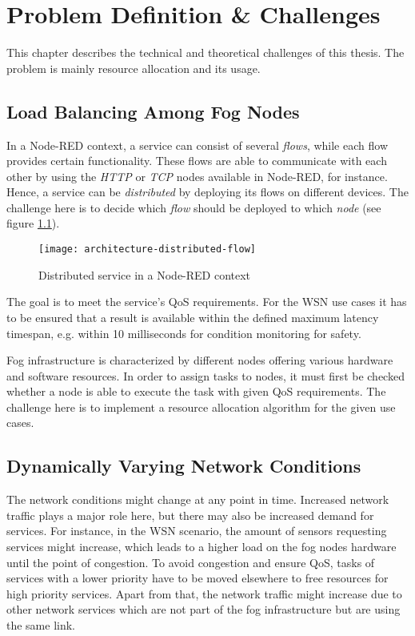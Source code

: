 \chapter{Problem Definition \& Challenges\label{cha:problem-definition}}
This chapter describes the technical and theoretical challenges of this thesis. The problem is mainly resource allocation and its usage.

\section{Load Balancing Among Fog Nodes}
In a Node-RED context, a service can consist of several \textit{flows}, while each flow provides certain functionality.
These flows are able to communicate with each other by using the \textit{HTTP} or \textit{TCP} nodes available in Node-RED, for instance.
Hence, a service can be \textit{distributed} by deploying its flows on different devices.
The challenge here is to decide which \textit{flow} should be deployed to which \textit{node} (see figure \ref{fig:distributed-flow}).

\begin{figure}[htp]
    \centering
    \texttt{[image: architecture-distributed-flow]}
    \caption{Distributed service in a Node-RED context}
    \label{fig:distributed-flow}
\end{figure}

The goal is to meet the service's QoS requirements.
For the WSN use cases it has to be ensured that a result is available within the defined maximum latency timespan, e.g. within 10 milliseconds for condition monitoring for safety.

Fog infrastructure is characterized by different nodes offering various hardware and software resources.
In order to assign tasks to nodes, it must first be checked whether a node is able to execute the task with given QoS requirements.
The challenge here is to implement a resource allocation algorithm for the given use cases.


\section{Dynamically Varying Network Conditions}
The network conditions might change at any point in time.
Increased network traffic plays a major role here, but there may also be increased demand for services.
For instance, in the WSN scenario, the amount of sensors requesting services might increase, which leads to a higher load on the fog nodes hardware until the point of congestion.
To avoid congestion and ensure QoS, tasks of services with a lower priority have to be moved elsewhere to free resources for high priority services.
Apart from that, the network traffic might increase due to other network services which are not part of the fog infrastructure but are using the same link.\\

